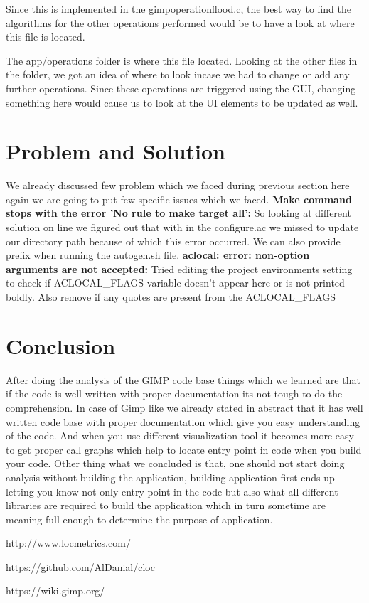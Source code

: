 Since this is implemented in the gimpoperationflood.c, the best way to find the algorithms for the other operations performed would be to have a look at where this file is located.
 
The app/operations folder is where this file located. Looking at the other files in the folder, we got an idea of where to look incase we had to change or add any further operations. Since these operations are triggered using the GUI, changing something here would cause us to look at the UI elements to be updated as well.

\section{Problem and Solution}
We already discussed few problem which we faced during previous section here again we are going to put few specific issues which we faced.
\newline
\textbf{Make command stops with the error 'No rule to make target all':} So looking at different solution on line we figured out that with in the configure.ac we missed to update our directory path because of which this error occurred. We can also provide prefix when running the autogen.sh file.
\newline
\textbf{aclocal: error: non-option arguments are not accepted:} Tried editing the project environments setting to check if  ACLOCAL\_FLAGS variable doesn't appear here or is not printed boldly. Also remove if any quotes are present from the  ACLOCAL\_FLAGS

\section{Conclusion}
After doing the analysis of the GIMP code base things which we learned are that if the code is well written with proper documentation its not tough to do the comprehension. In case of Gimp like we already stated in abstract that it has well written code base with proper documentation which give you easy understanding of the code. And when you use different visualization tool it becomes more easy to get proper call graphs which help to locate entry point in code when you build your code. Other thing what we concluded is that, one should not start doing analysis without building the application, building application first ends up letting you know not only entry point in the code but also what all different libraries are required to build the application which in turn sometime are meaning full enough to determine the purpose of application.

\newpage
\begin{thebibliography}{9}
	http://www.locmetrics.com/
	
	https://github.com/AlDanial/cloc
	
	https://wiki.gimp.org/
	
	
	
\end{thebibliography}

